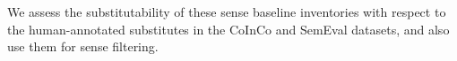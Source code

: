 \documentclass[11pt]{article}
\begin{document}
	
	We  assess the substitutability of these sense baseline inventories with respect to the human-annotated substitutes in the CoInCo and SemEval datasets, and also use them for sense filtering.
	
\end{document}
